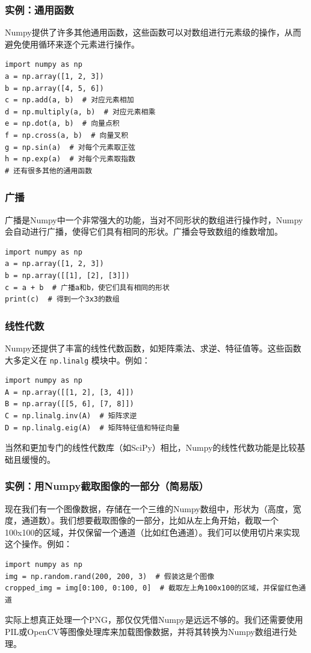 \begin{frame}[fragile]
    \frametitle{实例：通用函数}

    Numpy提供了许多其他通用函数，这些函数可以对数组进行元素级的操作，从而避免使用循环来逐个元素进行操作。

    \begin{verbatim}
import numpy as np
a = np.array([1, 2, 3])
b = np.array([4, 5, 6])
c = np.add(a, b)  # 对应元素相加
d = np.multiply(a, b)  # 对应元素相乘
e = np.dot(a, b)  # 向量点积
f = np.cross(a, b)  # 向量叉积
g = np.sin(a)  # 对每个元素取正弦
h = np.exp(a)  # 对每个元素取指数
# 还有很多其他的通用函数
    \end{verbatim}

\end{frame}

\begin{frame}[fragile]
    \frametitle{广播}
    广播是Numpy中一个非常强大的功能，当对不同形状的数组进行操作时，Numpy会自动进行广播，使得它们具有相同的形状。广播会导致数组的维数增加。
    \begin{verbatim}
import numpy as np
a = np.array([1, 2, 3])
b = np.array([[1], [2], [3]])
c = a + b  # 广播a和b，使它们具有相同的形状
print(c)  # 得到一个3x3的数组
    \end{verbatim}

\end{frame}

\begin{frame}[fragile]
    \frametitle{线性代数}

    Numpy还提供了丰富的线性代数函数，如矩阵乘法、求逆、特征值等。这些函数大多定义在 \texttt{np.linalg} 模块中。例如：
    \begin{verbatim}
import numpy as np
A = np.array([[1, 2], [3, 4]])
B = np.array([[5, 6], [7, 8]])
C = np.linalg.inv(A)  # 矩阵求逆
D = np.linalg.eig(A)  # 矩阵特征值和特征向量
    \end{verbatim}
    当然和更加专门的线性代数库（如SciPy）相比，Numpy的线性代数功能是比较基础且缓慢的。

\end{frame}

\begin{frame}[fragile]
    \frametitle{实例：用Numpy截取图像的一部分（简易版）}

    现在我们有一个图像数据，存储在一个三维的Numpy数组中，形状为（高度，宽度，通道数）。我们想要截取图像的一部分，比如从左上角开始，截取一个100x100的区域，并仅保留一个通道（比如红色通道）。我们可以使用切片来实现这个操作。例如：
    \begin{verbatim}
import numpy as np
img = np.random.rand(200, 200, 3)  # 假装这是个图像
cropped_img = img[0:100, 0:100, 0]  # 截取左上角100x100的区域，并保留红色通道
    \end{verbatim}

    实际上想真正处理一个PNG，那仅仅凭借Numpy是远远不够的。我们还需要使用PIL或OpenCV等图像处理库来加载图像数据，并将其转换为Numpy数组进行处理。

\end{frame}


